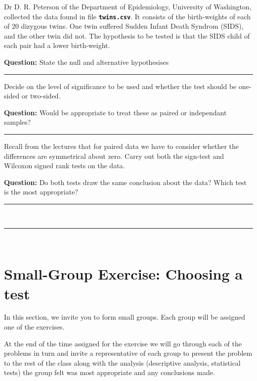 \documentclass[]{article}
\begin{document}
Dr D. R. Peterson of the Department of Epidemiology, University of
Washington, collected the data found in file
\textbf{\texttt{twins.csv}}. It consists of the birth-weights of each of
20 dizygous twins. One twin suffered Sudden Infant Death Syndrom (SIDS),
and the other twin did not. The hypothesis to be tested is that the SIDS
child of each pair had a lower birth-weight.

{\textbf{Question:}} State the null and alternative hypothesises

\begin{center}\rule{0.5\linewidth}{\linethickness}\end{center}

Decide on the level of significance to be used and whether the test
should be one-sided or two-sided.

{\textbf{Question:}} Would be appropriate to treat these as paired or
independant samples?

\begin{center}\rule{0.5\linewidth}{\linethickness}\end{center}

Recall from the lectures that for paired data we have to consider
whether the differences are symmetrical about zero. Carry out both the
sign-test and Wilcoxon signed rank tests on the data.

{\textbf{Question:}} Do both tests draw the same conclusion about the
data? Which test is the most appropriate?

\begin{center}\rule{0.5\linewidth}{\linethickness}\end{center}

~

\begin{center}\rule{0.5\linewidth}{\linethickness}\end{center}

~

\hypertarget{small-group-exercise-choosing-a-test}{%
\section{Small-Group Exercise: Choosing a
test}\label{small-group-exercise-choosing-a-test}}

In this section, we invite you to form small groups. Each group will be
assigned one of the exercises.

At the end of the time assigned for the exercise we will go through each
of the problems in turn and invite a representative of each group to
present the problem to the rest of the class along with the analysis
(descriptive analysis, statistical tests) the group felt was most
appropriate and any conclusions made.
\end{document}

